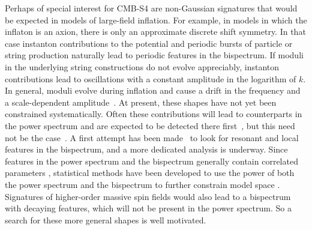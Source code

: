 Perhaps of special interest for CMB-S4 are non-Gaussian signatures that would be expected in models of large-field inflation. For example, in models in which the inflaton is an axion, there is only an approximate discrete shift symmetry. In that case instanton contributions to the potential and periodic bursts of particle or string production naturally lead to periodic features in the bispectrum. If moduli in the underlying string constructions do not evolve appreciably, instanton contributions lead to oscillations with a constant amplitude in the logarithm of $k$. In general, moduli evolve during inflation and cause a drift in the frequency and a scale-dependent amplitude~\cite{Flauger:2014ana}. At present, these shapes have not yet been constrained systematically. Often these contributions will lead to counterparts in the power spectrum and are expected to be detected there first~\cite{Behbahani:2011it}, but this need not be the case~\cite{Behbahani:2012be}. A first attempt has been made~\cite{Ade:2015ava} to look for resonant and local features in the bispectrum, and a more dedicated analysis is underway. Since features in the power spectrum and the bispectrum generally contain correlated parameters \cite{Meerburg:2009ys,Achucarro:2010da, Flauger:2010ja,Meerburg:2015yka,Achucarro:2012fd,Palma:2014hra}, statistical methods have been developed to use the power of both the power spectrum and the bispectrum to further constrain model space \cite{Fergusson:2014hya,Meerburg:2015owa}. Signatures of higher-order massive spin fields \cite{Arkani-Hamed:2015bza,Chen:2015lza} would also lead to a bispectrum with decaying features, which will not be present in the power spectrum.  So a search for these more general shapes is well motivated. 


%



